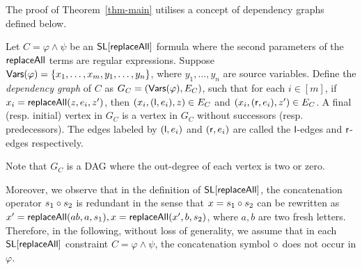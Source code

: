 The proof of Theorem~\ref{thm-main} utilises a concept of dependency graphs defined below.

\begin{definition}
	Let $C= \varphi \wedge \psi$ be an $\mathsf{SL}[\mathsf{replaceAll}]$ formula where the second parameters of the $\mathsf{replaceAll}$ terms are regular expressions. Suppose $\mathsf{Vars}(\varphi) = \{x_1,\dots, x_m, y_1, \dots, y_n\}$, where $y_1,\dots, y_n$ are  source variables. Define the \emph{dependency graph} of $C$ as $G_C= (\mathsf{Vars}(\varphi), E_C)$, such that for each $i \in [m]$, if $x_i = \mathsf{replaceAll}(z, e_i, z')$, then $(x_i, (\mathsf{l}, e_i), z) \in E_C$ and $(x_i, (\mathsf{r}, e_i), z') \in E_C$. A final (resp. initial) vertex in $G_C$ is a vertex in $G_C$ without successors (resp. predecessors). The edges labeled by $(\mathsf{l}, e_i)$ and $(\mathsf{r}, e_i)$ are called the $\mathsf{l}$-edges and $\mathsf{r}$-edges respectively. 
\end{definition}
Note that $G_C$ is a DAG where the out-degree of each vertex is two or zero. 

Moreover, we observe that in the definition of $\mathsf{SL}[\mathsf{replaceAll}]$,
%
the concatenation operator $s_1 \circ s_2$ is redundant in the sense that $x = s_1 \circ s_2$ can be rewritten as $x' = \mathsf{replaceAll}(ab, a, s_1), x = \mathsf{replaceAll}(x', b, s_2)$, where $a,b$ are two fresh letters.
%
Therefore,  in the following, without loss of generality, we assume that 
in each $\mathsf{SL}[\mathsf{replaceAll}]$ constraint $C=\varphi \wedge \psi$, the concatenation symbol $\circ$ does not occur in $\varphi$. 

